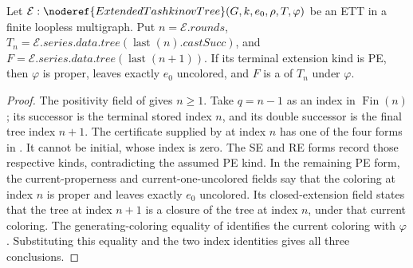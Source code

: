 \begin{lemma}
Let \(\mathcal E:\noderef{ExtendedTashkinovTree}(G,k,e_0,\rho,T,\varphi)\)
be an ETT in a finite loopless multigraph. Put \(n=\mathcal E.\mathit{rounds}\),
\(T_n=\mathcal E.\mathit{series.data.tree}(\operatorname{last}(n).\mathit{castSucc})\),
and \(F=\mathcal E.\mathit{series.data.tree}(\operatorname{last}(n+1))\).
If its terminal extension kind is PE, then \(\varphi\) is proper, leaves
exactly \(e_0\) uncolored, and \(F\) is a
 of \(T_n\) under \(\varphi\).
\end{lemma}
\begin{proof}
The positivity field of  gives \(n\geq1\).
Take \(q=n-1\) as an index in \(\operatorname{Fin}(n)\); its successor
is the terminal stored index \(n\), and its double successor is the final
tree index \(n+1\). The certificate supplied by 
at index \(n\) has one of the four forms in .
It cannot be initial, whose index is zero. The SE and RE forms record those
respective kinds, contradicting the assumed PE kind. In the remaining PE
form, the current-properness and current-one-uncolored fields say that the
coloring at index \(n\) is proper and leaves exactly \(e_0\) uncolored.
Its closed-extension field states that the tree at index \(n+1\) is a
closure of the tree at index \(n\), under that current coloring.
The generating-coloring equality of 
identifies the current coloring with \(\varphi\). Substituting this equality
and the two index identities gives all three conclusions.
\end{proof}
